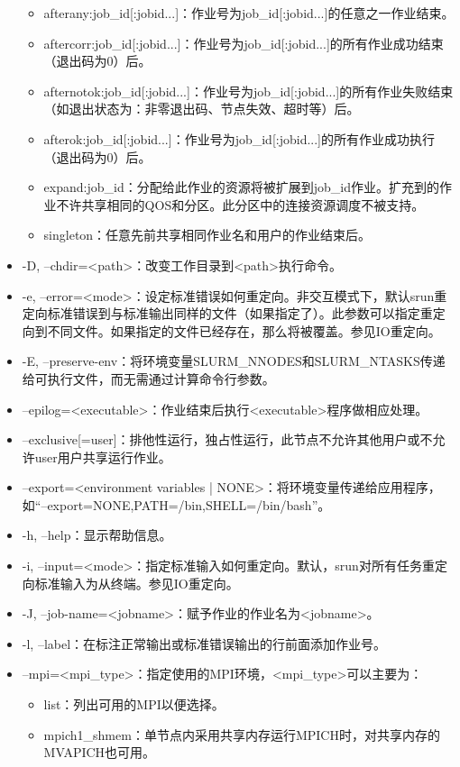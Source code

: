 \begin{itemize}
\begin{itemize}
    \item afterany:job\_id[:jobid...]：作业号为job\_id[:jobid...]的任意之一作业结束。
    \item aftercorr:job\_id[:jobid...]：作业号为job\_id[:jobid...]的所有作业成功结束（退出码为0）后。
    \item afternotok:job\_id[:jobid...]：作业号为job\_id[:jobid...]的所有作业失败结束（如退出状态为：非零退出码、节点失效、超时等）后。
    \item afterok:job\_id[:jobid...]：作业号为job\_id[:jobid...]的所有作业成功执行（退出码为0）后。
    \item expand:job\_id：分配给此作业的资源将被扩展到job\_id作业。扩充到的作业不许共享相同的QOS和分区。此分区中的连接资源调度不被支持。
    \item singleton：任意先前共享相同作业名和用户的作业结束后。
\end{itemize}
\item -D, --chdir=<path>：改变工作目录到<path>执行命令。
\item -e, --error=<mode>：设定标准错误如何重定向。非交互模式下，默认srun重定向标准错误到与标准输出同样的文件（如果指定了）。此参数可以指定重定向到不同文件。如果指定的文件已经存在，那么将被覆盖。参见IO重定向。
\item -E, --preserve-env：将环境变量SLURM\_NNODES和SLURM\_NTASKS传递给可执行文件，而无需通过计算命令行参数。
\item --epilog=<executable>：作业结束后执行<executable>程序做相应处理。
\item --exclusive[=user]：排他性运行，独占性运行，此节点不允许其他用户或不允许user用户共享运行作业。
\item --export=<environment variables | NONE>：将环境变量传递给应用程序，如``--export=NONE,PATH=/bin,SHELL=/bin/bash''。
\item -h, --help：显示帮助信息。
\item -i, --input=<mode>：指定标准输入如何重定向。默认，srun对所有任务重定向标准输入为从终端。参见IO重定向。
\item -J, --job-name=<jobname>：赋予作业的作业名为<jobname>。
\item -l, --label：在标注正常输出或标准错误输出的行前面添加作业号。
\item --mpi=<mpi\_type>：指定使用的MPI环境，<mpi\_type>可以主要为：
\begin{itemize}
	\item list：列出可用的MPI以便选择。
	\item mpich1\_shmem：单节点内采用共享内存运行MPICH时，对共享内存的MVAPICH也可用。

\end{itemize}
\end{itemize}
